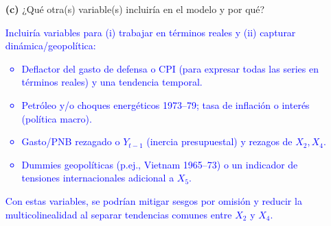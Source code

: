 \documentclass[10pt]{article}
\begin{document}
\begin{enumerate}
    \item[\textbf{(c)}] ¿Qué otra(s) variable(s) incluiría en el modelo y por qué?\\
    \textcolor{blue}{
        Incluiría variables para (i) trabajar en términos reales y (ii) capturar dinámica/geopolítica:
        \begin{itemize}
        \item Deflactor del gasto de defensa o CPI (para expresar todas las series en términos reales) y una tendencia temporal.
        \item Petróleo y/o choques energéticos 1973–79; tasa de inflación o interés (política macro).
        \item Gasto/PNB rezagado o \(Y_{t-1}\) (inercia presupuestal) y rezagos de \(X_2, X_4\).
        \item Dummies geopolíticas (p.ej., Vietnam 1965–73) o un indicador de tensiones internacionales adicional a \(X_5\).
        \end{itemize}
        Con estas variables, se podrían mitigar sesgos por omisión y reducir la multicolinealidad al separar tendencias comunes entre \(X_2\) y \(X_4\).
    }
\end{enumerate}
\end{document}
